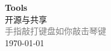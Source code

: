\vspace*{\fill}
\begin{center}
    \textcolor{orange!50}{\Huge\textbf{Tools}} \\[1em]
    \textcolor{orange!60!pink}{\Large 开源与共享} \\[2em]
    \textcolor{gray}{\large 手指敲打键盘如你敲击琴键} \\[1em]
    \today
\end{center}
\vspace*{\fill}
\clearpage


\clearpage

\clearpage


